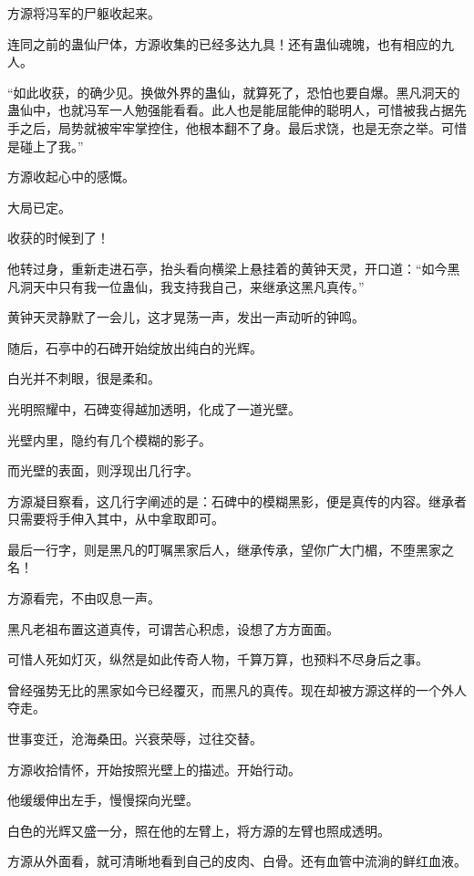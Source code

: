 
\begin{this_body}

方源将冯军的尸躯收起来。

连同之前的蛊仙尸体，方源收集的已经多达九具！还有蛊仙魂魄，也有相应的九人。

“如此收获，的确少见。换做外界的蛊仙，就算死了，恐怕也要自爆。黑凡洞天的蛊仙中，也就冯军一人勉强能看看。此人也是能屈能伸的聪明人，可惜被我占据先手之后，局势就被牢牢掌控住，他根本翻不了身。最后求饶，也是无奈之举。可惜是碰上了我。”

方源收起心中的感慨。

大局已定。

收获的时候到了！

他转过身，重新走进石亭，抬头看向横梁上悬挂着的黄钟天灵，开口道：“如今黑凡洞天中只有我一位蛊仙，我支持我自己，来继承这黑凡真传。”

黄钟天灵静默了一会儿，这才晃荡一声，发出一声动听的钟鸣。

随后，石亭中的石碑开始绽放出纯白的光辉。

白光并不刺眼，很是柔和。

光明照耀中，石碑变得越加透明，化成了一道光壁。

光壁内里，隐约有几个模糊的影子。

而光壁的表面，则浮现出几行字。

方源凝目察看，这几行字阐述的是：石碑中的模糊黑影，便是真传的内容。继承者只需要将手伸入其中，从中拿取即可。

最后一行字，则是黑凡的叮嘱黑家后人，继承传承，望你广大门楣，不堕黑家之名！

方源看完，不由叹息一声。

黑凡老祖布置这道真传，可谓苦心积虑，设想了方方面面。

可惜人死如灯灭，纵然是如此传奇人物，千算万算，也预料不尽身后之事。

曾经强势无比的黑家如今已经覆灭，而黑凡的真传。现在却被方源这样的一个外人夺走。

世事变迁，沧海桑田。兴衰荣辱，过往交替。

方源收拾情怀，开始按照光壁上的描述。开始行动。

他缓缓伸出左手，慢慢探向光壁。

白色的光辉又盛一分，照在他的左臂上，将方源的左臂也照成透明。

方源从外面看，就可清晰地看到自己的皮肉、白骨。还有血管中流淌的鲜红血液。


\end{this_body}
